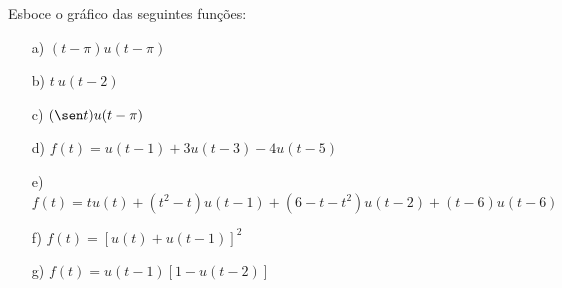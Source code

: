 \begin{exer}{\label{ex_Heaviside0}}Esboce o gráfico das seguintes funções:
\begin{itemize}
 \item [a)] $\displaystyle (t-\pi)u(t-\pi)$
 \item [b)] $\displaystyle t \ u(t-2)$
 \item [c)] $\displaystyle (\sen t) u(t-\pi)$
 \item [d)] $f(t)=u(t-1)+3u(t-3)-4u(t-5)$
 \item [e)] $f(t)=tu(t)+(t^2-t)u(t-1)+(6-t-t^2)u(t-2)+(t-6)u(t-6)$
 \item [f)] $f(t)=\left[u(t)+u(t-1)\right]^2$
 \item [g)] $f(t)=u(t-1)\left[1-u(t-2)\right] $
\end{itemize}
\end{exer}
